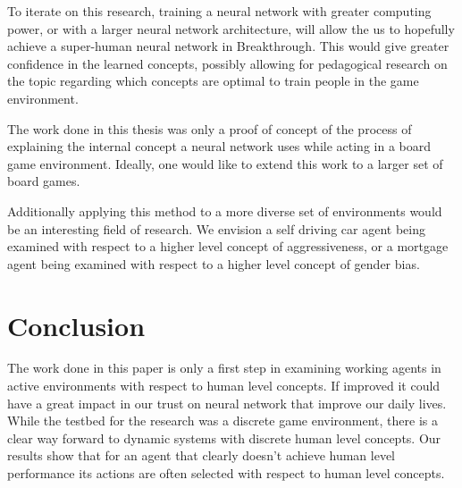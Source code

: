 To iterate on this research, training a neural network with greater computing power, or with a larger neural network architecture, will allow the us to hopefully achieve a super-human neural network in Breakthrough. This would give greater confidence in the learned concepts, possibly allowing for pedagogical research on the topic regarding which concepts are optimal to train people in the game environment.

The work done in this thesis was only a proof of concept of the process of explaining the internal concept a neural network uses while acting in a board game environment. Ideally, one would like to extend this work to a larger set of board games.

Additionally applying this method to a more diverse set of environments would be an interesting field of research. We envision a self driving car agent being examined with respect to a higher level concept of aggressiveness, or a mortgage agent being examined with respect to a higher level concept of gender bias.

\section{Conclusion}

The work done in this paper is only a first step in examining working agents in active environments with respect to human level concepts. If improved it could have a great impact in our trust on neural network that improve our daily lives. While the testbed for the research was a discrete game environment, there is a clear way forward to dynamic systems with discrete human level concepts. Our results show that for an agent that clearly doesn't achieve human level performance its actions are often selected with respect to human level concepts.

